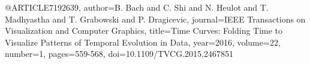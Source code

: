 @ARTICLE{7192639,
  author={B. {Bach} and C. {Shi} and N. {Heulot} and T. {Madhyastha} and T. {Grabowski} and P. {Dragicevic}},
  journal={IEEE Transactions on Visualization and Computer Graphics}, 
  title={Time Curves: Folding Time to Visualize Patterns of Temporal Evolution in Data}, 
  year={2016},
  volume={22},
  number={1},
  pages={559-568},
  doi={10.1109/TVCG.2015.2467851}}